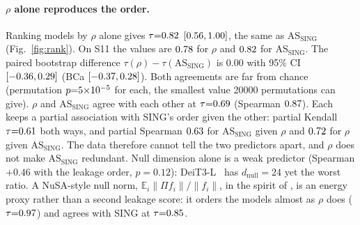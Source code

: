 \documentclass[10pt]{article}
\newcommand{\ASS}{\mathrm{AS}_{\mathrm{SING}}}
\begin{document}
\paragraph{$\rho$ alone reproduces the order.}
Ranking models by $\rho$ alone gives $\tau{=}0.82$ $[0.56,1.00]$, the same as $\ASS$ (Fig.~\ref{fig:rank}).
On S11 the values are $0.78$ for $\rho$ and $0.82$ for $\ASS$.
The paired bootstrap difference $\tau(\rho)-\tau(\ASS)$ is $0.00$ with 95\% CI $[-0.36,0.29]$ (BCa $[-0.37,0.28]$).
Both agreements are far from chance (permutation $p{=}5{\times}10^{-5}$ for each, the smallest value 20000 permutations can give).
$\rho$ and $\ASS$ agree with each other at $\tau{=}0.69$ (Spearman $0.87$).
Each keeps a partial association with SING's order given the other: partial Kendall $\tau{=}0.61$ both ways, and partial Spearman $0.63$ for $\ASS$ given $\rho$ and $0.72$ for $\rho$ given $\ASS$.
The data therefore cannot tell the two predictors apart, and $\rho$ does not make $\ASS$ redundant.
Null dimension alone is a weak predictor (Spearman $+0.46$ with the leakage order, $p{=}0.12$): DeiT3-L~\citep{deit3} has $d_{\mathrm{null}}{=}24$ yet the worst ratio.
A NuSA-style null norm, $\mathbb{E}_i\|\Pi f_i\|/\|f_i\|$, in the spirit of \citet{cook2020}, is an energy proxy rather than a second leakage score: it orders the models almost as $\rho$ does ($\tau{=}0.97$) and agrees with SING at $\tau{=}0.85$.
\end{document}
